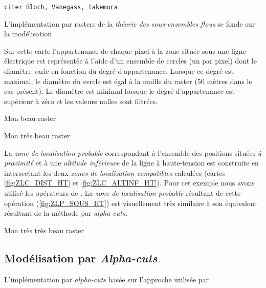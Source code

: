 \texttt{citer Bloch, Vanegass, takemura}

L'implémentation par rasters de la \emph{théorie des sous-ensembles
  flous} se fonde sur la modélisation


Sur cette carte l'appartenance de chaque pixel à la zone située sous
une ligne électrique est représentée à l'aide d'un ensemble de cercles
(un par pixel) dont le diamètre varie en fonction du degré
d'appartenance. Lorsque ce degré est maximal, le diamètre du cercle
est égal à la maille du raster (50 mètres dans le cas présent). Le
diamètre est minimal lorsque le degré d'appartenance est supérieur à
zéro et les valeurs nulles sont filtrées.

\begin{carte}
  \centering
  
  \caption{Mon beau raster}
  \label{fig:ZLC_DIST_HT}
\end{carte}


\begin{carte}
  \centering
  
  \caption{Mon très beau raster}
  \label{fig:ZLC_ALTINF_HT}
\end{carte}

La \emph{zone de localisation probable} correspondant à l'ensemble des
positions situées \emph{à proximité} et à une \emph{altitude
  inférieure} de la ligne à haute-tension est construite en
intersectant les deux \emph{zones de localisation compatibles}
calculées (cartes \ref{fig:ZLC_DIST_HT} et
\ref{fig:ZLC_ALTINF_HT}). Pour cet exemple nous avons utilisé les
opérateurs de \textcite{Zadeh1965}.
%
La \emph{zone de localisation probable} résultant de cette opération
(\ref{fig:ZLP_SOUS_HT}) est visuellement très similaire à son
équivalent résultant de la méthode par \emph{alpha-cuts.}

\begin{carte}
  \centering
  
  \caption{Mon très très beau raster}
  \label{fig:ZLP_SOUS_HT}
\end{carte}


\subsection{Modélisation par \emph{Alpha-cuts}}

L'implémentation par \emph{alpha-cuts} basée sur l'approche utilisée
par \textcite{Runz2008a,Zoghlami2016}.




